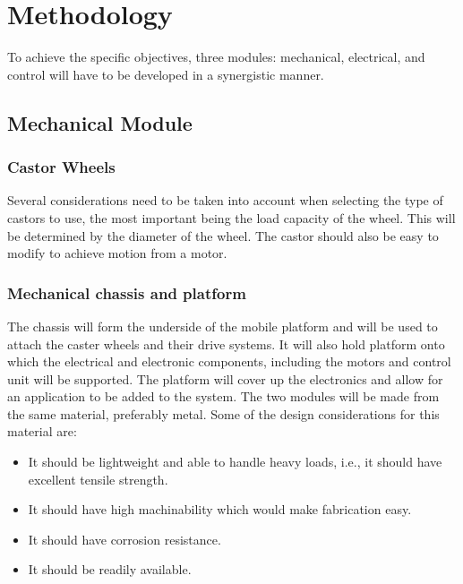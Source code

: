 \section{Methodology}
\label{sec:methodology}

To achieve the specific objectives, three modules: mechanical, electrical, and control will have to be developed in a synergistic manner. 

\subsection{Mechanical Module}

\subsubsection{Castor Wheels}

Several considerations need to be taken into account when selecting the type of castors to use, the most important being the load capacity of the wheel.
This will be determined by the diameter of the wheel.
The castor should also be easy to modify to achieve motion from a motor.

\subsubsection{Mechanical chassis and platform}

The chassis will form the underside of the mobile platform and will be used to attach the caster wheels and their drive systems.
It will also hold platform onto which the electrical and electronic components, including the motors and control unit will be supported.
The platform will cover up the electronics and allow for an application to be added to the system.
The two modules will be made from the same material, preferably metal. 
Some of the design considerations for this material are:

\begin{itemize}

    \item It should be lightweight and able to handle heavy loads, i.e., it should have excellent tensile strength.
    
    \item It should have high machinability which would make fabrication easy.
    
    \item It should have corrosion resistance.
    
    \item It should be readily available.
    
\end{itemize}

